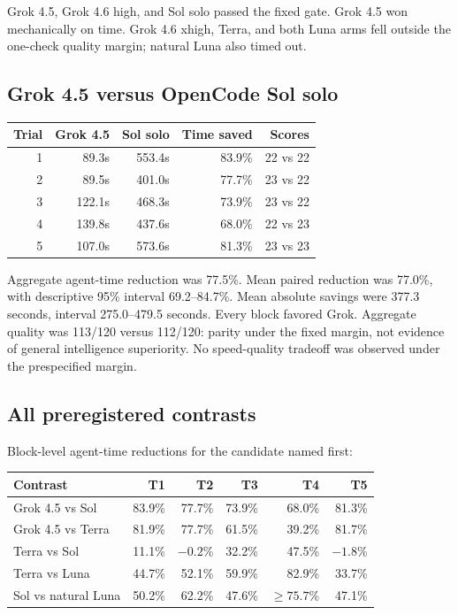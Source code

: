 \documentclass[11pt,oneside]{article}
\begin{document}
Grok 4.5, Grok 4.6 high, and Sol solo passed the fixed gate. Grok 4.5 won
mechanically on time. Grok 4.6 xhigh, Terra, and both Luna arms fell outside the
one-check quality margin; natural Luna also timed out.

\subsection{Grok 4.5 versus OpenCode Sol solo}

\begin{center}
\begin{tabular}{@{}rrrrr@{}}
\toprule
Trial & Grok 4.5 & Sol solo & Time saved & Scores \\
\midrule
1 & 89.3s & 553.4s & 83.9\% & 22 vs 22 \\
2 & 89.5s & 401.0s & 77.7\% & 23 vs 22 \\
3 & 122.1s & 468.3s & 73.9\% & 23 vs 22 \\
4 & 139.8s & 437.6s & 68.0\% & 22 vs 23 \\
5 & 107.0s & 573.6s & 81.3\% & 23 vs 23 \\
\bottomrule
\end{tabular}
\end{center}

Aggregate agent-time reduction was 77.5\%. Mean paired reduction was 77.0\%,
with descriptive 95\% interval 69.2--84.7\%. Mean absolute savings were 377.3
seconds, interval 275.0--479.5 seconds. Every block favored Grok. Aggregate
quality was 113/120 versus 112/120: parity under the fixed margin, not evidence
of general intelligence superiority. No speed-quality tradeoff was observed
under the prespecified margin.

\subsection{All preregistered contrasts}

Block-level agent-time reductions for the candidate named first:

\begin{center}
\small
\begin{tabular}{@{}lrrrrr@{}}
\toprule
Contrast & T1 & T2 & T3 & T4 & T5 \\
\midrule
Grok 4.5 vs Sol & 83.9\% & 77.7\% & 73.9\% & 68.0\% & 81.3\% \\
Grok 4.5 vs Terra & 81.9\% & 77.7\% & 61.5\% & 39.2\% & 81.7\% \\
Terra vs Sol & 11.1\% & $-0.2$\% & 32.2\% & 47.5\% & $-1.8$\% \\
Terra vs Luna & 44.7\% & 52.1\% & 59.9\% & 82.9\% & 33.7\% \\
Sol vs natural Luna & 50.2\% & 62.2\% & 47.6\% & $\geq75.7$\% & 47.1\% \\
\bottomrule
\end{tabular}
\end{center}
\end{document}
